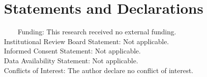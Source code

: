 \documentclass[12pt]{article}
\begin{document}
\section*{Statements and Declarations}

\ \ \ \
Funding: This research received no external funding. \\


Institutional Review Board Statement: Not applicable.\\


Informed Consent Statement: Not applicable.\\

 
Data Availability Statement: Not applicable.\\

 
Conflicts of Interest: The author declare no conflict of interest.


\end{document}
